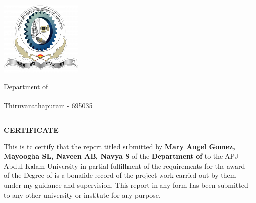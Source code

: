 \thispagestyle{plain}
\noindent
\begin{minipage}{0.30\textwidth}
\includegraphics[width=40mm]{logo.png}
\end{minipage}
\begin{minipage}{0.70\textwidth}

 Department of \Department \\
 \University \\
 Thiruvanathapuram - 695035
\end{minipage}

\vspace{0.5\baselineskip}
\hrule
\vspace{2\baselineskip}

\begin{center}
{\Large {\bf \uppercase{Certificate}}}
\end{center}

\vspace{\baselineskip}

\noindent 

This is to certify that the report titled {\bf \ReportTitle}submitted by {\bf Mary Angel Gomez, Mayoogha SL, Naveen AB, Navya S} of the {\bf Department of \Department} to the APJ Abdul Kalam
University in partial fulfillment of the requirements for the award of the Degree of \emph{\Degree} is a bonafide record of the project work
carried out by them under my guidance and supervision. This report in any form has been
submitted
to
any
other
university
or
institute
for
any
purpose.

\vspace{4\baselineskip}

